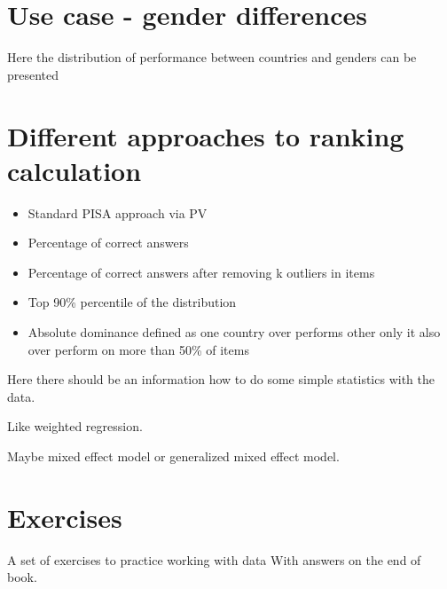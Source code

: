 \section{Use case - gender differences}

Here the distribution of performance between countries and genders can be presented



\section{Different approaches to ranking calculation}

\begin{itemize}
\item Standard PISA approach via PV
\item Percentage of correct answers
\item Percentage of correct answers after removing k outliers in items
\item Top 90\% percentile of the distribution
\item Absolute dominance defined as one country over performs other only it also over perform on more than 50\% of items
\end{itemize}








Here there should be an information how to do some simple statistics with the data.

Like weighted regression.

Maybe mixed effect model or generalized mixed effect model.


\section{Exercises}

A set of exercises to practice working with data
With answers on the end of book.


